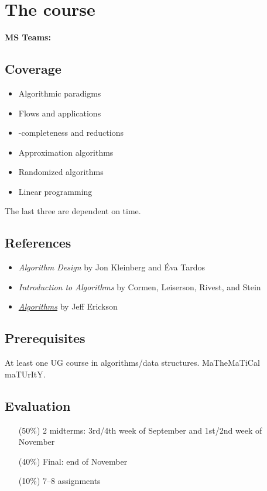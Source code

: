 \chapter*{The course} \label{chp:course}

\textbf{MS Teams:} 

\section*{Coverage}
\begin{itemize}
    \item Algorithmic paradigms
    \item Flows and applications
    \item \NP-completeness and reductions
    \item Approximation algorithms
    \item Randomized algorithms
    \item Linear programming
\end{itemize}
The last three are dependent on time.

\section*{References}
\begin{itemize}
    \item \textit{Algorithm Design} by Jon Kleinberg and Éva Tardos
    \item \textit{Introduction to Algorithms}
        by Cormen, Leiserson, Rivest, and Stein
    \item \textit{\href{http://jeffe.cs.illinois.edu/teaching/algorithms/}
        {Algorithms}} by Jeff Erickson
\end{itemize}

\section*{Prerequisites}
At least one UG course in algorithms/data structures.
MaTheMaTiCal maTUrItY.

\section*{Evaluation}
\begin{itemize}
    \item[(50\%)] 2 midterms: 3rd/4th week of September and 1st/2nd week of
        November
    \item[(40\%)] Final: end of November
    \item[(10\%)] 7--8 assignments
\end{itemize}

